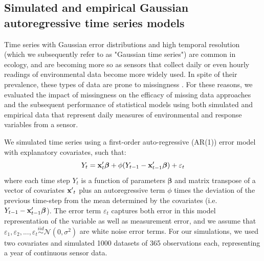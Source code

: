 \documentclass{article}
\begin{document}
\subsection*{Simulated and empirical Gaussian autoregressive time series models}

Time series with Gaussian error distributions and high temporal resolution (which we subsequently refer to as "Gaussian time series") are common in ecology, and are becoming more so as sensors that collect daily or even hourly readings of environmental data become more widely used. In spite of their prevalence, these types of data are prone to missingness \citep{chen2013ecological}. For these reasons, we evaluated the impact of missingness on the efficacy of missing data approaches and the subsequent performance of statistical models using both simulated and empirical data that represent daily measures of environmental and response variables from a sensor. 

We simulated time series using a first-order auto-regressive (AR(1)) error model with explanatory covariates, such that:
\begin{equation}
    Y_t = {\bf x}_t'{\bm \beta} + \phi (Y_{t-1} - {\bf x}_{t-1}'{\bm \beta}) + \varepsilon_t
\label{eq:ar1}
\end{equation}
where each time step \(Y_t\) is a function of parameters \(\bm \beta\) and matrix transpose of a vector of covariates \({\bf x'}_t\)%
 plus an autoregressive term \(\phi\) times the deviation of the previous time-step from the mean determined by the covariates (i.e. $Y_{t-1} - {\bf x}_{t-1}'{\bm \beta}$). The error term \(\varepsilon_t\) captures both error in this model representation of the variable as well as measurement error, and we assume that $\varepsilon_1, \varepsilon_2,..., \varepsilon_t \overset{iid}{\sim} \mathcal{N}(0, \sigma^2)$ are white noise error terms. For our simulations, we used two covariates and simulated 1000 datasets of 365 observations each, representing a year of continuous sensor data. %
\end{document}
